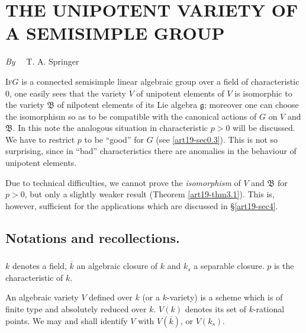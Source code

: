 \chapter[\textsc{T. A. Springer~:} The Unipotent Variety of a Semi-Simple Group]{THE UNIPOTENT VARIETY OF A SEMISIMPLE GROUP}\label{art19}

\begin{center}
{\em By}~~ T. A. Springer
\end{center}


\setcounter{pageoriginal}{372}
\textsc{If}\pageoriginale $G$ is a connected semisimple linear algebraic group over a field of characteristic $0$, one easily sees that the variety $V$ of unipotent elements of $V$ is isomorphic to the variety $\mathfrak{B}$ of nilpotent elements of its Lie algebra $\mathfrak{g}$; moreover one can choose the isomorphism so as to be compatible with the canonical actions of $G$ on $V$ and $\mathfrak{B}$. In this note the analogous situation in characteristic $p>0$ will be discussed. We have to restrict $p$ to be ``good'' for $G$ (see \ref{art19-sec0.3}). This is not so surprising, since in ``bad'' characteristics there are anomalies in the behaviour of unipotent elements.

Due to technical difficulties, we cannot prove the {\em isomorphism} of $V$ and $\mathfrak{B}$ for $p>0$, but only a slightly weaker result (Theorem \ref{art19-thm3.1}). This is, however, sufficient for the applications which are discussed in \S\ref{art19-sec4}.

\setcounter{section}{-1}
\section{Notations and recollections.}\label{art19-sec0}

\subsection{}\label{art19-sec0.1} 
$k$ denotes a field, $\overline{k}$ an algebraic closure of $k$ and $k_{s}$ a separable closure. $p$ is the characteristic of $k$.

An algebraic variety $V$ defined over $k$ (or a $k$-variety) is a scheme which is of finite type and absolutely reduced over $k$. $V(k)$ denotes its set of $k$-rational points. We may and shall identify $V$ with $V(\overline{k})$, or $V(k_{s})$.

